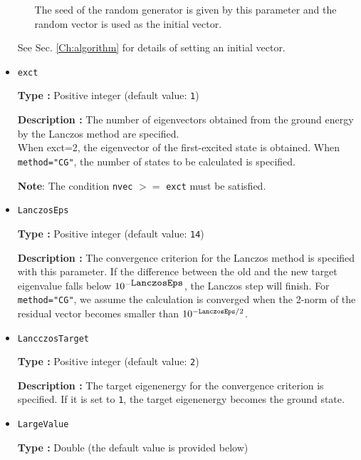 \begin{itemize}
\begin{itemize}
The seed of the random generator is given by this parameter and the random vector is used as the initial vector.
\end{itemize}
See Sec. \ref{Ch:algorithm} for details of setting an initial vector.




\item \verb|exct|

{\bf Type :} Positive integer (default value: \verb|1|)

{\bf Description :} The number of eigenvectors obtained from the ground energy by the Lanczos method are specified.\\
When exct=2, the eigenvector of the first-excited state is obtained.
When \verb|method="CG"|, the number of states to be calculated is specified.

{\bf Note}: The condition \verb|nvec| $>=$ \verb|exct| must be satisfied.

\item \verb|LanczosEps|

{\bf Type :} Positive integer (default value: \verb|14|)

{\bf Description :} The convergence criterion for the Lanczos method is specified with this parameter.
If the difference between the old and the new target eigenvalue falls below $10^{- \verb|LanczosEps|}$, 
the Lanczos step will finish.
For \verb|method="CG"|, we assume the calculation is converged
when the 2-norm of the residual vector becomes smaller than $10^{-{\tt LanczosEps}/2}$.

\item \verb|LancczosTarget|

{\bf Type :} Positive integer (default value: \verb|2|)

{\bf Description :} The target eigenenergy for the convergence criterion is specified.
If it is set to \verb|1|, the target eigenenergy becomes the ground state.

\item \verb|LargeValue|

{\bf Type :} Double (the default value is provided below)


\end{itemize}
